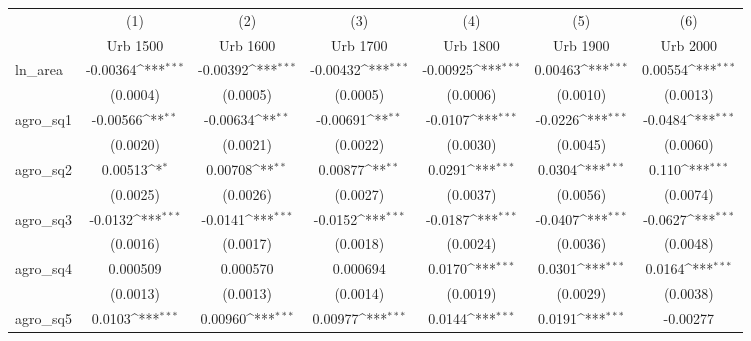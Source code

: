 {
\def\sym#1{\ifmmode^{#1}\else\(^{#1}\)\fi}
\begin{tabular}{l*{6}{c}}
\toprule
                    &\multicolumn{1}{c}{(1)}&\multicolumn{1}{c}{(2)}&\multicolumn{1}{c}{(3)}&\multicolumn{1}{c}{(4)}&\multicolumn{1}{c}{(5)}&\multicolumn{1}{c}{(6)}\\
                    &\multicolumn{1}{c}{Urb 1500}&\multicolumn{1}{c}{Urb 1600}&\multicolumn{1}{c}{Urb 1700}&\multicolumn{1}{c}{Urb 1800}&\multicolumn{1}{c}{Urb 1900}&\multicolumn{1}{c}{Urb 2000}\\
\midrule
ln\_area             &    -0.00364\sym{***}&    -0.00392\sym{***}&    -0.00432\sym{***}&    -0.00925\sym{***}&     0.00463\sym{***}&     0.00554\sym{***}\\
                    &    (0.0004)         &    (0.0005)         &    (0.0005)         &    (0.0006)         &    (0.0010)         &    (0.0013)         \\
\addlinespace
agro\_sq1            &    -0.00566\sym{**} &    -0.00634\sym{**} &    -0.00691\sym{**} &     -0.0107\sym{***}&     -0.0226\sym{***}&     -0.0484\sym{***}\\
                    &    (0.0020)         &    (0.0021)         &    (0.0022)         &    (0.0030)         &    (0.0045)         &    (0.0060)         \\
\addlinespace
agro\_sq2            &     0.00513\sym{*}  &     0.00708\sym{**} &     0.00877\sym{**} &      0.0291\sym{***}&      0.0304\sym{***}&       0.110\sym{***}\\
                    &    (0.0025)         &    (0.0026)         &    (0.0027)         &    (0.0037)         &    (0.0056)         &    (0.0074)         \\
\addlinespace
agro\_sq3            &     -0.0132\sym{***}&     -0.0141\sym{***}&     -0.0152\sym{***}&     -0.0187\sym{***}&     -0.0407\sym{***}&     -0.0627\sym{***}\\
                    &    (0.0016)         &    (0.0017)         &    (0.0018)         &    (0.0024)         &    (0.0036)         &    (0.0048)         \\
\addlinespace
agro\_sq4            &    0.000509         &    0.000570         &    0.000694         &      0.0170\sym{***}&      0.0301\sym{***}&      0.0164\sym{***}\\
                    &    (0.0013)         &    (0.0013)         &    (0.0014)         &    (0.0019)         &    (0.0029)         &    (0.0038)         \\
\addlinespace
agro\_sq5            &      0.0103\sym{***}&     0.00960\sym{***}&     0.00977\sym{***}&      0.0144\sym{***}&      0.0191\sym{***}&    -0.00277         \\

\end{tabular}}
